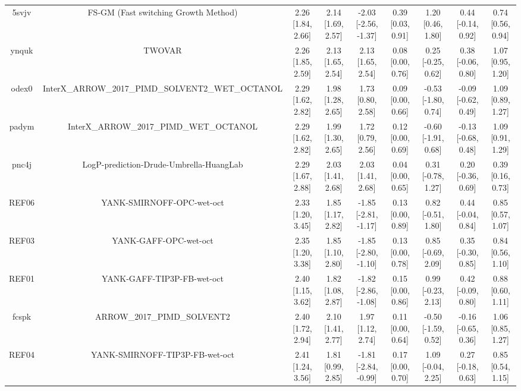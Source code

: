 \documentclass{article}
\begin{document}
\begin{center}
\begin{longtable}{|ccccccccc|}
 5svjv &               FS-GM (Fast switching Growth Method) &  2.26 [1.84, 2.66] &  2.14 [1.69, 2.57] &  -2.03 [-2.56, -1.37] &  0.39 [0.03, 0.91] &    1.20 [0.46, 1.80] &   0.44 [-0.14, 0.92] &     0.74 [0.56, 0.94] \\
 ynquk &                                             TWOVAR &  2.26 [1.85, 2.59] &  2.13 [1.65, 2.54] &     2.13 [1.65, 2.54] &  0.08 [0.00, 0.76] &   0.25 [-0.25, 0.62] &   0.38 [-0.06, 0.80] &     1.07 [0.95, 1.20] \\
 odex0 &  InterX\_ARROW\_2017\_PIMD\_SOLVENT2\_WET\_OCTANOL &  2.29 [1.62, 2.82] &  1.98 [1.28, 2.65] &     1.73 [0.80, 2.58] &  0.09 [0.00, 0.66] &  -0.53 [-1.80, 0.74] &  -0.09 [-0.62, 0.49] &     1.09 [0.89, 1.27] \\
 padym &            InterX\_ARROW\_2017\_PIMD\_WET\_OCTANOL &  2.29 [1.62, 2.82] &  1.99 [1.30, 2.65] &     1.72 [0.79, 2.56] &  0.12 [0.00, 0.69] &  -0.60 [-1.91, 0.68] &  -0.13 [-0.68, 0.48] &     1.09 [0.91, 1.29] \\
 pnc4j &            LogP-prediction-Drude-Umbrella-HuangLab &  2.29 [1.67, 2.88] &  2.03 [1.41, 2.68] &     2.03 [1.41, 2.68] &  0.04 [0.00, 0.65] &   0.31 [-0.78, 1.27] &   0.20 [-0.36, 0.69] &     0.39 [0.16, 0.73] \\
 REF06 &                          YANK-SMIRNOFF-OPC-wet-oct &  2.33 [1.20, 3.45] &  1.85 [1.17, 2.82] &  -1.85 [-2.81, -1.17] &  0.13 [0.00, 0.89] &   0.82 [-0.51, 1.80] &   0.44 [-0.04, 0.84] &     0.85 [0.57, 1.07] \\
 REF03 &                              YANK-GAFF-OPC-wet-oct &  2.35 [1.20, 3.38] &  1.85 [1.10, 2.80] &  -1.85 [-2.80, -1.10] &  0.13 [0.00, 0.78] &   0.85 [-0.69, 2.09] &   0.35 [-0.30, 0.85] &     0.84 [0.56, 1.10] \\
 REF01 &                         YANK-GAFF-TIP3P-FB-wet-oct &  2.40 [1.15, 3.62] &  1.82 [1.08, 2.87] &  -1.82 [-2.86, -1.08] &  0.15 [0.00, 0.86] &   0.99 [-0.23, 2.13] &   0.42 [-0.09, 0.80] &     0.88 [0.60, 1.11] \\
 fcspk &                        ARROW\_2017\_PIMD\_SOLVENT2 &  2.40 [1.72, 2.94] &  2.10 [1.41, 2.77] &     1.97 [1.12, 2.74] &  0.11 [0.00, 0.64] &  -0.50 [-1.59, 0.52] &  -0.16 [-0.65, 0.36] &     1.06 [0.85, 1.27] \\
 REF04 &                     YANK-SMIRNOFF-TIP3P-FB-wet-oct &  2.41 [1.24, 3.56] &  1.81 [0.99, 2.85] &  -1.81 [-2.84, -0.99] &  0.17 [0.00, 0.70] &   1.09 [-0.04, 2.25] &   0.27 [-0.18, 0.63] &     0.85 [0.54, 1.15] \\

\end{longtable}
\end{center}
\end{document}
